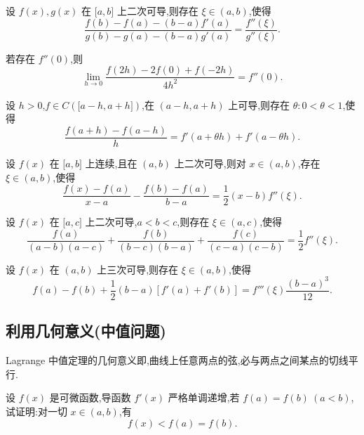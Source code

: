 \documentclass[../../数学分析培优讲义.tex]{subfiles}
\begin{document}
\begin{example}
设 $f(x),g(x)$ 在 $\lbrack a,b\rbrack$ 上二次可导,则存在 $\xi\in(a,b)$,使得
\[
    \dfrac{f(b)-f(a)-(b-a)f'(a)}{g(b)-g(a)-(b-a)g'(a)}
    =\dfrac{f''(\xi)}{g''(\xi)}.
\]
\end{example}
\exampleblank

\begin{example}
若存在 $f''(0)$,则
\[
    \lim\limits_{h\to0}
    \dfrac{f(2h)-2f(0)+f(-2h)}{4h^2}
    =f''(0).
\]
\end{example}
\exampleblank

\begin{example}
设 $h>0$,$f\in C(\lbrack a-h,a+h\rbrack)$,在 $(a-h,a+h)$ 上可导,则存在 $\theta:0<\theta<1$,使得
\[
    \dfrac{f(a+h)-f(a-h)}{h}
    =f'(a+\theta h)+f'(a-\theta h).
\]
\end{example}
\exampleblank

\begin{example}
设 $f(x)$ 在 $\lbrack a,b\rbrack$ 上连续,且在 $(a,b)$ 上二次可导,则对 $x\in(a,b)$,存在 $\xi\in(a,b)$,使得
\[
    \dfrac{f(x)-f(a)}{x-a}
    -\dfrac{f(b)-f(a)}{b-a}
    =\dfrac{1}{2}(x-b)f''(\xi).
\]
\end{example}
\exampleblank

\begin{example}
设 $f(x)$ 在 $\lbrack a,c\rbrack$ 上二次可导,$a<b<c$,则存在 $\xi\in(a,c)$,使得
\[
    \dfrac{f(a)}{(a-b)(a-c)}
    +\dfrac{f(b)}{(b-c)(b-a)}
    +\dfrac{f(c)}{(c-a)(c-b)}
    =\dfrac{1}{2}f''(\xi).
\]
\end{example}
\exampleblank

\begin{example}
设 $f(x)$ 在 $(a,b)$ 上三次可导,则存在 $\xi\in(a,b)$,使得
\[
    f(a)-f(b)+\dfrac{1}{2}(b-a)[f'(a)+f'(b)]
    =f'''(\xi)\dfrac{(b-a)^3}{12}.
\]
\end{example}
\exampleblank



\subsection{利用几何意义(中值问题)}

Lagrange 中值定理的几何意义即,曲线上任意两点的弦,必与两点之间某点的切线平行.

\begin{example}
设 $f(x)$ 是可微函数,导函数 $f'(x)$ 严格单调递增,若 $f(a)=f(b)\ (a<b)$,试证明:对一切 $x\in(a,b)$,有
\[
    f(x)<f(a)=f(b).
\]
\end{example}
\exampleblank
\end{document}
